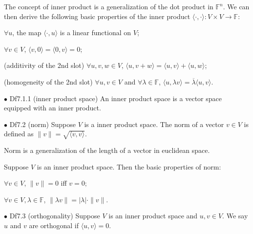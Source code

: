 \documentclass{article}
\begin{document}
\begin{Rmk}{}
    The concept of inner product is a generalization of the dot product in $\mathbb{F}^n$. We can then derive the following basic properties of the inner product $\langle \cdot, \cdot\rangle: V\times V\rightarrow \mathbb{F}$:
    \textcolor{Th}{
    \begin{compactenum}
        \item $\forall u$, the map $\langle \cdot, u\rangle$ is a linear functional on $V$;
        \item $\forall v\in V$, $\langle v, 0\rangle = \langle 0, v\rangle = 0$;
        \item (additivity of the 2nd slot) $\forall u, v, w\in V$, $\langle u, v+w\rangle = \langle u, v\rangle + \langle u, w\rangle$;
        \item (homogeneity of the 2nd slot) $\forall u, v\in V$ and $\forall \lambda\in \mathbb{F}$, $\langle u, \lambda v\rangle = \overline{\lambda}\langle u, v\rangle$.
    \end{compactenum}
    }
\end{Rmk}

\begin{Df}{$\bullet$ Df7.1.1 (inner product space)}
    An inner product space is a vector space equipped with an inner product.
\end{Df}

\begin{Df}{$\bullet$ Df7.2 (norm)}
    Suppose $V$ is a inner product space. The norm of a vector $v\in V$ is defined as $\|v\| = \sqrt{\langle v, v\rangle}$.
\end{Df}

\begin{Rmk}{}
    Norm is a generalization of the length of a vector in euclidean space. 
    \textcolor{Th}{Suppose $V$ is an inner product space. Then the basic properties of norm:
    \begin{compactenum}
        \item $\forall v\in V$, $\|v\|=0$ iff $v=0$;
        \item $\forall v\in V, \lambda\in\mathbb{F}$, $\|\lambda v\| = |\lambda|\cdot \|v\|$.
    \end{compactenum}}
\end{Rmk}

\begin{Df}{$\bullet$ Df7.3 (orthogonality)}
    Suppose $V$ is an inner product space and $u, v\in V$. We say $u$ and $v$ are orthogonal if $\langle u, v\rangle = 0$.
\end{Df}
\end{document}

